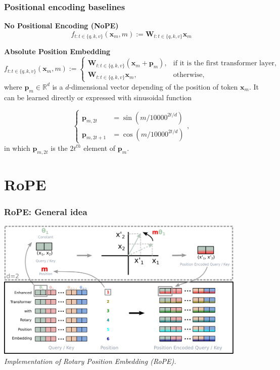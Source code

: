 \documentclass[notheorems,10pt]{beamer}
\def\p{{\mathbf p}}
\def\x{{\mathbf x}}
\def\W{{\mathbf W}}
\begin{document}
\begin{frame}
    \frametitle{Positional encoding baselines}

    \textbf{No Positional Encoding (NoPE)}
    \begin{equation*}
        f_{t:t\in\{q,k,v\}}(\x_m,m):=\W_{t:t\in\{q,k,v\}}\x_m
    \end{equation*}

    \pause
    \vfill
    
    \textbf{Absolute Position Embedding}
    \begin{equation*}
        f_{t:t\in\{q,k,v\}}(\x_m, m) :=
        \begin{cases} 
            \W_{t:t\in\{q,k,v\}}(\x_m + \p_m), & \text{if it is the first transformer layer}, \\[0.4cm]
            \W_{t:t\in\{q,k,v\}}\x_m, & \text{otherwise},
        \end{cases}
    \end{equation*}
    where $\p_m\in\mathbb{R}^{d}$ is a $d$-dimensional vector depending of the position of token $\x_m$. It can be learned directly or expressed with sinusoidal function
    
    \begin{equation*}
	\begin{cases}
		\p_{m,2t}&=\sin(m/10000^{2t/d})\\
		\p_{m,2t+1}&=\cos(m/10000^{2t/d})
	\end{cases},
    \end{equation*}
    in which $\p_{m,2t}$ is the $2t^{th}$ element of $\p_m$.
\end{frame}


\section[RoPE]{RoPE}

\begin{frame}
    \frametitle{RoPE: General idea}
    
    \begin{center}
        \includegraphics[width=0.9\textwidth]{attachments/RoPE.pdf}
        \\[1ex]
        \textit{Implementation of Rotary Position Embedding (RoPE).}
    \end{center}
\end{frame}
\end{document}
